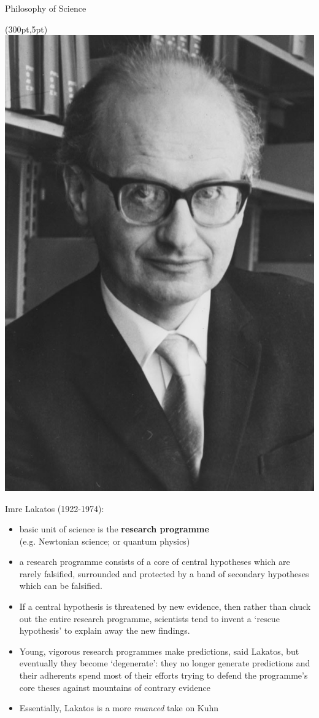 \documentclass{beamer}
\begin{document}
\begin{frame}{Philosophy of Science}
	\begin{textblock*}{50pt}(300pt,5pt)
		\includegraphics[width=1\textwidth]{../images/lakatos.jpg}
	\end{textblock*}
	Imre Lakatos (1922-1974):
		\begin{itemize}
			\item<2-> basic unit of science is the \textbf{research programme} \\ (e.g. Newtonian science; or quantum physics)
			\item<3-> a research programme consists of a core of central hypotheses which are rarely falsified, surrounded and protected by a band of secondary hypotheses which can be falsified. 
			\item<4-> If a central hypothesis is threatened by new evidence, then rather than chuck out the entire research programme, scientists tend to invent a `rescue hypothesis' to explain away the new findings. 
			\item<5-> Young, vigorous research programmes make predictions, said Lakatos, but eventually they become `degenerate': they no longer generate predictions and their adherents spend most of their efforts trying to defend the programme's core theses against mountains of contrary evidence
			\item<6-> Essentially, Lakatos is a more \textit{nuanced} take on Kuhn
		\end{itemize}


\end{frame}
\end{document}
